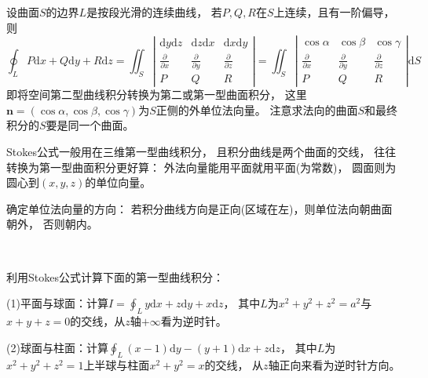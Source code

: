 \begin{theorem}[Stokes公式]
  设曲面$S$的边界$L$是按段光滑的连续曲线，
  若$P,Q,R$在$S$上连续，且有一阶偏导，则
  \begin{equation*}
    \oint_LP\mathrm{d}x + Q\mathrm{d}y + R\mathrm{d}z = \iint _S \left|
      \begin{array}{ccc}
        \mathrm{d} y \mathrm{d} z&\mathrm{d}z\mathrm{d}x&\mathrm{d}x\mathrm{d}y\\
        \frac{\partial}{\partial x}&\frac{\partial}{\partial y}& \frac{\partial}{\partial z}\\
        P&Q&R
      \end{array}
    \right| = \iint_S \left|
      \begin{array}{ccc}
        \cos \alpha& \cos \beta&\cos \gamma\\
        \frac{\partial}{\partial x}& \frac{\partial}{\partial y}& \frac{\partial}{\partial z}\\
        P&Q&R
      \end{array}
    \right| \mathrm{d} S
  \end{equation*}
  即将空间第二型曲线积分转换为第二或第一型曲面积分，
  这里$\mathbf{n} = (\cos \alpha, \cos \beta, \cos \gamma)$为$S$正侧的外单位法向量。
  注意求法向的曲面$S$和最终积分的$S$要是同一个曲面。
\end{theorem}

\begin{note}
  Stokes公式一般用在三维第一型曲线积分，
  且积分曲线是两个曲面的交线，
  往往转换为第一型曲面积分更好算：
  外法向量能用平面就用平面(为常数)，
  圆面则为圆心到$(x,y,z)$的单位向量。
\end{note}

\begin{note}
  确定单位法向量的方向：
  若积分曲线方向是正向(区域在左)，则单位法向朝曲面朝外，
  否则朝内。
\end{note}

~

\begin{exercise}[一次项Stokes公式]
  利用Stokes公式计算下面的第一型曲线积分：
  
  (1)平面与球面：计算$I = \oint_L y \mathrm{d} x + z \mathrm{d} y + x \mathrm{d} z$，
  其中$L$为$x^2 + y^2 + z^2 = a^2$与$x+y+z = 0$的交线，从$z$轴$+\infty$看为逆时针。

  (2)球面与柱面：计算$\oint _L (x - 1)\mathrm{d} y - (y + 1)\mathrm{d} x + z \mathrm{d} z$，
  其中$L$为$x^2 + y^2 + z^2 = 1$上半球与柱面$x^2 + y^2 = x$的交线，
  从$z$轴正向来看为逆时针方向。
\end{exercise}

